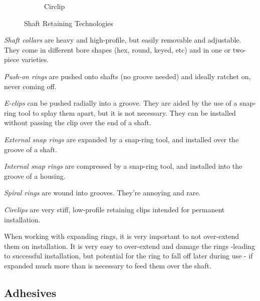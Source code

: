 \begin{figure}[H]
\begin{subfigure}[b]{.24\linewidth}
			\caption{Circlip}
		\end{subfigure}
		\caption{Shaft Retaining Technologies}
	\end{figure}
	
	
	\begin{asparaenum}[a)]
		\item \textit{Shaft collars} are heavy and high-profile, but easily removable and adjustable. They come in different bore shapes (hex, round, keyed, etc) and in one or two-piece varieties.
		\item \textit{Push-on rings} are pushed onto shafts (no groove needed) and ideally ratchet on, never coming off.
		\item \textit{E-clips} can be pushed radially into a groove. They are aided by the use of a snap-ring tool to splay them apart, but it is not necessary. They can be installed without passing the clip over the end of a shaft.
		\item \textit{External snap rings} are expanded by a snap-ring tool, and installed over the groove of a shaft.
		\item \textit{Internal snap rings} are compressed by a snap-ring tool, and installed into the groove of a housing.
		\item \textit{Spiral rings} are wound into grooves. They're annoying and rare.
		\item \textit{Circlips} are very stiff, low-profile retaining clips intended for permanent installation.

	\end{asparaenum}
	
	When working with expanding rings, it is very important to not over-extend them on installation. It is very easy to over-extend and damage the rings -leading to successful installation, but potential for the ring to fall off later during use - if expanded much more than is necessary to feed them over the shaft.
	
	\subsection{Adhesives}
	
